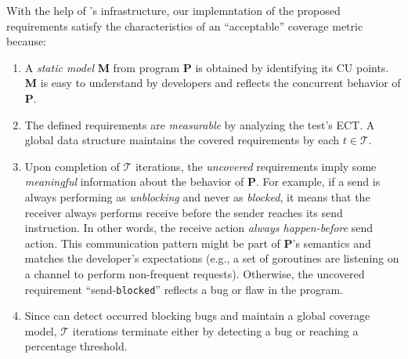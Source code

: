%
With the help of \goat's infrastructure, our implemntation of the proposed requirements satisfy the characteristics of an ``acceptable'' coverage metric because:
\begin{enumerate}
  \item A \textit{static model} \textbf{M} from program \textbf{P} is obtained by identifying its CU points. \textbf{M} is easy to understand by developers and reflects the concurrent behavior of \textbf{P}.
  \item The defined requirements are \textit{measurable} by analyzing the test's ECT. A global data structure maintains the covered requirements by each $t \in \mathcal{T}$.
  \item Upon completion of $\mathcal{T}$ iterations, the \textit{uncovered} requirements imply some \textit{meaningful} information about the behavior of \textbf{P}. For example, if a send is always performing as \textit{unblocking} and never as \textit{blocked}, it means that the receiver always performs receive before the sender reaches its send instruction. In other words, the receive action \textit{always happen-before} send action. This communication pattern might be part of \textbf{P}'s semantics and matches the developer's expectations (e.g., a set of goroutines are listening on a channel to perform non-frequent requests). Otherwise, the uncovered requirement  ``send-\texttt{blocked}'' reflects a bug or flaw in the program.
  \item Since \goat can detect occurred blocking bugs and maintain a global coverage model, $\mathcal{T}$ iterations terminate either by detecting a bug or reaching a percentage threshold.
\end{enumerate}

